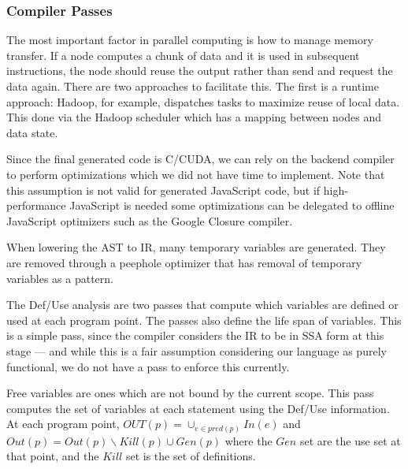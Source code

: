 \subsubsection{Compiler Passes}

The most important factor in parallel computing is how to manage memory
transfer. If a node computes a chunk of data and it is used in
subsequent instructions, the node should reuse the output rather than
send and request the data again. There are two approaches to facilitate
this. The first is a runtime approach: Hadoop, for example, dispatches
tasks to maximize reuse of local data. This done via the Hadoop
scheduler which has a mapping between nodes and data state.

Since the final generated code is C/CUDA, we can rely on the backend compiler
	to perform optimizations which we did not have time
	to implement.
Note that this assumption is not valid for generated
	JavaScript code, but if high-performance JavaScript is needed
        some optimizations
	can be delegated to offline JavaScript optimizers such as the
	Google Closure\cite{bolin2010closure} compiler.




When lowering the AST to IR, many temporary variables are generated.
They are removed through a peephole optimizer that has removal of
	temporary variables as a pattern.


The Def/Use analysis are two passes that compute which variables are defined
	or used at each program point.
The passes also define the life span of variables.
This is a simple pass, since the compiler considers the IR to be in SSA form
 	at this stage --- and while this is a fair assumption considering our
	language as purely functional, we do not have a pass to enforce this currently.


Free variables are ones which are not bound by the current scope.
This pass computes the set of variables at each statement using
	the Def/Use information.
At each program point, $OUT(p) = \cup_{e \in pred(p)} In(e)$ and $Out(p) = Out(p) \backslash Kill(p) \cup Gen(p)$
	where the $Gen$ set are the use set at that point, and the $Kill$ set is the set
 of definitions.


